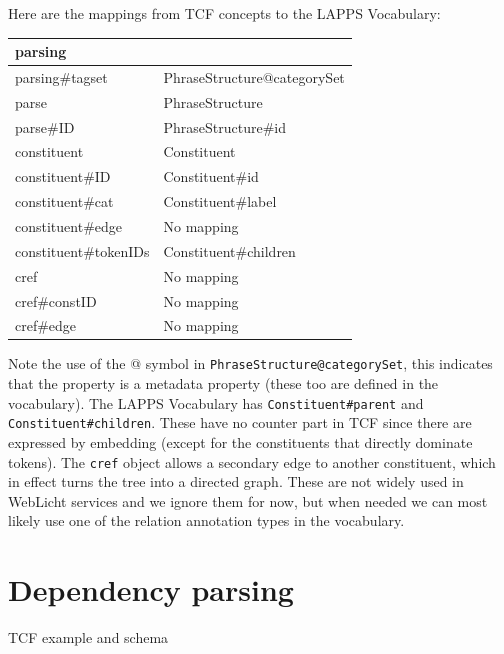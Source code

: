 \documentclass[11pt]{article}
\newcommand{\tag}[1]{{\tt #1}}
\newenvironment{mappings}
	{\medskip\begin{tabular}{|l|l|}\hline}
	{\hline\end{tabular}\medskip}
\begin{document}
\newpage
Here are the mappings from TCF concepts to the LAPPS Vocabulary:

\begin{mappings}
parsing					& \\ \hline
parsing\#tagset			& PhraseStructure@categorySet	\\ \hline
parse					& PhraseStructure 				\\ \hline
parse\#ID				& PhraseStructure\#id			\\ \hline
constituent 			& Constituent 					\\ \hline
constituent\#ID 		& Constituent\#id 				\\ \hline
constituent\#cat 		& Constituent\#label		 	\\ \hline
constituent\#edge 		& No mapping				 	\\ \hline
constituent\#tokenIDs 	& Constituent\#children			\\ \hline
cref 					& No mapping 					\\ \hline
cref\#constID		 	& No mapping 					\\ \hline
cref\#edge 				& No mapping 					\\ 
\end{mappings}

Note the use of the @ symbol in \tag{PhraseStructure@categorySet}, this indicates that the property is a metadata property (these too are defined in the vocabulary). The LAPPS Vocabulary has \tag{Constituent\#parent} and \tag{Constituent\#children}. These have no counter part in TCF since there are expressed by embedding (except for the constituents that directly dominate tokens). The \tag{cref} object allows a secondary edge to another constituent, which in effect turns the tree into a directed graph. These are not widely used in WebLicht services and we ignore them for now, but when needed we can most likely use one of the relation annotation types in the vocabulary.


\newpage
\section{Dependency parsing}

TCF example and schema
\end{document}
